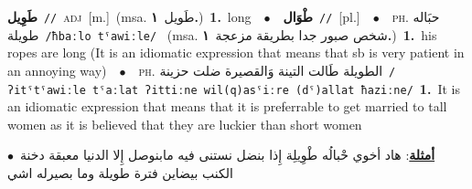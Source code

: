 \documentclass[10pt,a4paper,twoside]{article} %
\begin{document}
\begin{multicols}{2}
{\setlength\topsep{0pt}\textbf{\foreignlanguage{arabic}{طَوِيل}}\ {\color{gray}\texttt{//}\color{black}}\ \textsc{adj}\ [m.]\ \color{gray}(msa. \foreignlanguage{arabic}{طَويل}~\foreignlanguage{arabic}{\textbf{١.}})\color{black}\ \textbf{1.}~long\ \ $\bullet$\ \ \setlength\topsep{0pt}\textbf{\foreignlanguage{arabic}{طْوَال}}\ {\color{gray}\texttt{//}\color{black}}\ [pl.]\ \ $\bullet$\ \ \textsc{ph.} \color{gray} \foreignlanguage{arabic}{حبَاله طويلة}\color{black}\ {\color{gray}\texttt{/{\sffamily ħbaːlo tˤawiːle}/}\color{black}}\ \color{gray} (msa. \foreignlanguage{arabic}{شخص صبور جدا بطريقة مزعجة}~\foreignlanguage{arabic}{\textbf{١.}})\color{black}\ \textbf{1.}~his ropes are long (It is an idiomatic expression that means that sb is very patient in an annoying way)\ \ $\bullet$\ \ \textsc{ph.} \color{gray} \foreignlanguage{arabic}{الطويلة طَالت التينة وَالقصيرة ضلت حزينة}\color{black}\ {\color{gray}\texttt{/{\sffamily ʔitˤtˤawiːle tˤaːlat ʔittiːne wil(q)asˤiːre (dˤ)allat ħaziːne}/}\color{black}}\ \textbf{1.}~It is an idiomatic expression that means that it is preferrable to get married to tall women as it is believed that they are luckier than short women\  \begin{flushright}\color{gray}\foreignlanguage{arabic}{\textbf{\underline{\foreignlanguage{arabic}{أمثلة}}}: هاد أخوي حْبالُه طْوِيلِة إِذا بنضل نستنى فيه مابنوصل إِلا الدنيا معبقة دخنة\ $\bullet$\ \  الكنب بيضاين فترة طويلة وما بصيرله اشي}\end{flushright}\color{black}} \vspace{2mm}


\end{multicols}
\end{document}
